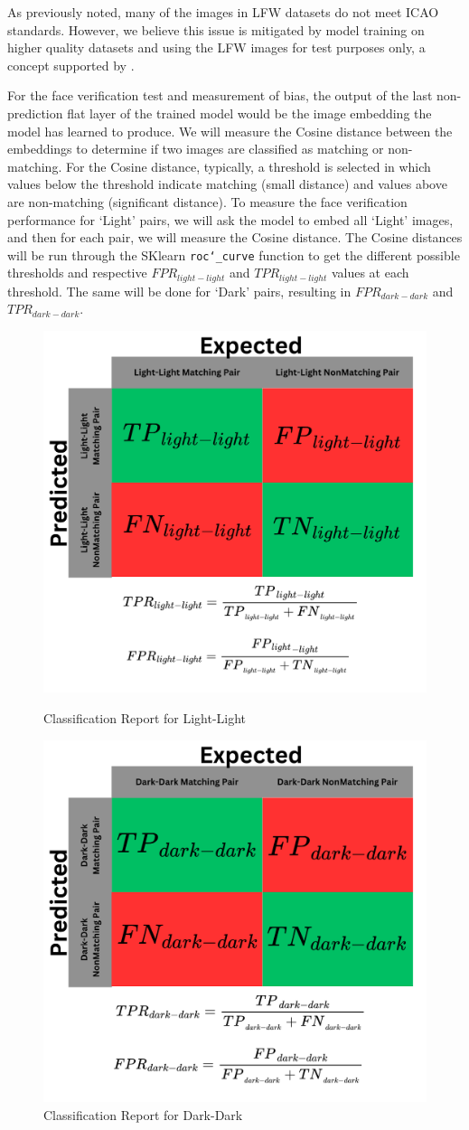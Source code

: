\documentclass[conference]{IEEEtran}
\begin{document}
As previously noted, many of the images in LFW datasets do not meet ICAO standards. However, we believe this issue is mitigated by model training on higher quality datasets and using the LFW images for test purposes only, a concept supported by \cite{taigman2014deepface}. 

For the face verification test and measurement of bias, the output of the last non-prediction flat layer of the trained model would be the image embedding the model has learned to produce. We will measure the Cosine distance between the embeddings to determine if two images are classified as matching or non-matching. For the Cosine distance, typically, a threshold is selected in which values below the threshold indicate matching (small distance) and values above are non-matching (significant distance).  To measure the face verification performance for ‘Light’ pairs, we will ask the model to embed all ‘Light’ images, and then for each pair, we will measure the Cosine distance. The Cosine distances will be run through the SKlearn \texttt{roc\char`_curve} function to get the different possible thresholds and respective $FPR_{light-light}$ and $TPR_{light-light}$ values at each threshold. The same will be done for ‘Dark’ pairs, resulting in $FPR_{dark-dark}$ and $TPR_{dark-dark}$. 

\begin{figure}[hbt!]
    \centering
    \includegraphics[height=0.5\linewidth]{latex/images/PredictedVsExpectedLight.png}
    \caption{Classification Report for Light-Light}
    \label{classification_report_light_light}
    \centering
    \includegraphics[height=0.5\linewidth]{latex/images/PredictedVsExpectedDark.png}
    \caption{Classification Report for Dark-Dark}
    \label{classification_report_dark_dark}
\end{figure}
\end{document}
